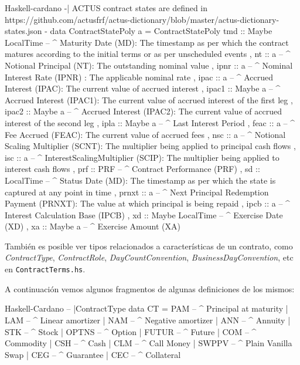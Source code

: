\documentclass[12pt]{book}
\begin{document}
\begin{code}[title=Contract state poly.]{Haskell-cardano}
{-| ACTUS contract states are defined in
    https://github.com/actusfrf/actus-dictionary/blob/master/actus-dictionary-states.json
-}
data ContractStatePoly a = ContractStatePoly
  {
    tmd   :: Maybe LocalTime -- ^ Maturity Date (MD): The timestamp as per which the contract matures according to the initial terms or as per unscheduled events
  , nt    :: a               -- ^ Notional Principal (NT): The outstanding nominal value
  , ipnr  :: a               -- ^ Nominal Interest Rate (IPNR) : The applicable nominal rate
  , ipac  :: a               -- ^ Accrued Interest (IPAC): The current value of accrued interest
  , ipac1 :: Maybe a         -- ^ Accrued Interest (IPAC1): The current value of accrued interest of the first leg
  , ipac2 :: Maybe a         -- ^ Accrued Interest (IPAC2): The current value of accrued interest of the second leg
  , ipla  :: Maybe a         -- ^ Last Interest Period
  , feac  :: a               -- ^ Fee Accrued (FEAC): The current value of accrued fees
  , nsc   :: a               -- ^ Notional Scaling Multiplier (SCNT): The multiplier being applied to principal cash flows
  , isc   :: a               -- ^ InterestScalingMultiplier (SCIP): The multiplier being applied to interest cash flows
  , prf   :: PRF             -- ^ Contract Performance (PRF)
  , sd    :: LocalTime       -- ^ Status Date (MD): The timestamp as per which the state is captured at any point in time
  , prnxt :: a               -- ^ Next Principal Redemption Payment (PRNXT): The value at which principal is being repaid
  , ipcb  :: a               -- ^ Interest Calculation Base (IPCB)
  , xd    :: Maybe LocalTime -- ^ Exercise Date (XD)
  , xa    :: Maybe a         -- ^ Exercise Amount (XA)
  }
\end{code}


También es posible ver tipos relacionados a características de un contrato, como \textit{ContractType}, \textit{ContractRole}, \textit{DayCountConvention}, \textit{BusinessDayConvention}, etc en \texttt{ContractTerms.hs}.

A continuación vemos algunos fragmentos de algunas definiciones de los mismos:

\begin{code}[title=Tipos de contrato.]{Haskell-Cardano}
-- |ContractType
data CT = PAM   -- ^ Principal at maturity
        | LAM   -- ^ Linear amortizer
        | NAM   -- ^ Negative amortizer
        | ANN   -- ^ Annuity
        | STK   -- ^ Stock
        | OPTNS -- ^ Option
        | FUTUR -- ^ Future
        | COM   -- ^ Commodity
        | CSH   -- ^ Cash
        | CLM   -- ^ Call Money
        | SWPPV -- ^ Plain Vanilla Swap
        | CEG   -- ^ Guarantee
        | CEC   -- ^ Collateral
\end{code}
\end{document}
